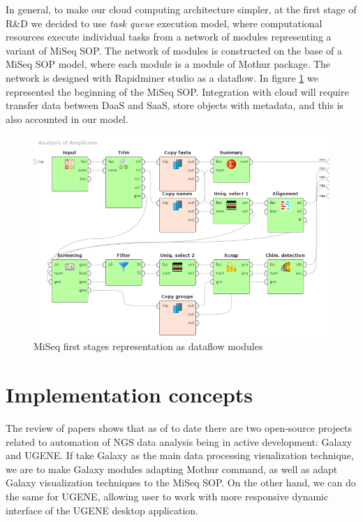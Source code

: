 \documentclass[a4paper]{jpconf}
\begin{document}
In general, to make our cloud computing architecture simpler, at the first stage of R\&D we decided to use \emph{task queue} execution model, where computational resources execute individual tasks from a network of modules representing a variant of MiSeq SOP.  The network of modules is constructed on the base of a MiSeq SOP model, where each module is a module of Mothur package.  The network is designed with Rapidminer studio as a dataflow. In figure \ref{fig:mothur} we represented the beginning of the MiSeq SOP.  Integration with cloud will require transfer data between DaaS and SaaS, store objects with metadata, and this is also accounted in our model.




\begin{figure}[bt]
  \centering
   \includegraphics[width=0.9\linewidth]{Dataflow-color-en.png}
  \caption{MiSeq first stages representation as dataflow modules \cite{cherk19}}
  \label{fig:mothur}
\end{figure}


\section{Implementation concepts}

The review of papers shows that as of to date there are two open-source projects related to automation of NGS data analysis being in active development: Galaxy and UGENE.  If take Galaxy as the main data processing visualization technique, we are to make Galaxy modules adapting Mothur command, as well as adapt Galaxy visualization techniques to the MiSeq SOP.  On the other hand, we can do the same for UGENE, allowing user to work with more responsive dynamic interface of the UGENE desktop application.
\end{document}
